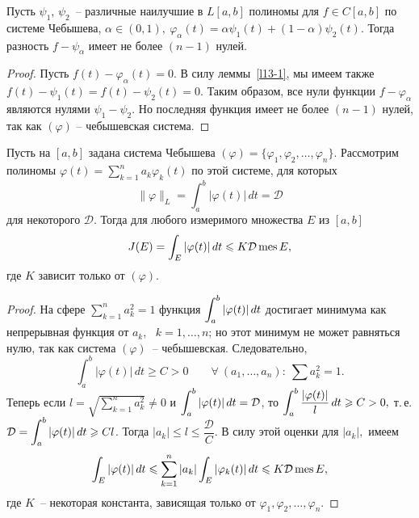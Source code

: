 \begin{lemma}\label{J-sign-change}
Пусть $\psi_1$, $\psi_2$~-- различные наилучшие {в $L[a,b]$} полиномы для
{$f \in C[a,b]$} по системе Чебышева, $\alpha\in (0,1),\ \varphi_{\alpha}(t)=
\alpha\psi_1(t)+(1-\alpha)\psi_2(t)$. Тогда разность
$f-\psi_{\alpha}$ имеет не более $(n-1)$ нулей.
\end{lemma}

\begin{proof}
Пусть $f(t)-\varphi_{\alpha}(t)=0.$ В силу
леммы~\ref{l13-1}, мы имеем также $f(t)-\psi_1(t)=f(t)-\psi_2(t)=0.$
Таким образом, все нули функции $f-\varphi_{\alpha}$
являются нулями $\psi_1-\psi_2.$ Но последняя функция имеет
не более $(n-1)$ нулей, так как $(\varphi)$ -- чебышевская
система.
\end{proof}

\begin{lemma}\label{J-integral}
Пусть на $[a,b]$ задана система Чебышева $(\varphi) = \{\varphi_1, \varphi_2, \ldots, \varphi_n\}$. Рассмотрим полиномы
$\varphi(t)=\sum\limits_{k=1}^n a_k \varphi_k(t)$ по этой системе, для которых
$$
\|\varphi\|_L=\int_a^b |\varphi(t)|\, dt=\mathcal D
$$
для некоторого $\mathcal D$. Тогда для любого измеримого множества $E$ из $[a,b]$
$$
J(E)=\int_E |\varphi(t)|\, dt \leqslant K\mathcal D\,{\rm mes \, } E,
$$
где $K$ зависит только от $(\varphi)$.
\end{lemma}

\begin{proof}
На сфере $\sum\limits_{k=1}^n a_k^2=1$ функция $\displaystyle\int_a^b |\varphi(t)|\, dt$ достигает минимума как непрерывная функция от $a_k$,~
$k=1,\ldots,n$; но этот минимум не может равняться нулю, так как система $(\varphi)$~-- чебышевская. Следовательно,
$$
\int_a^b |\varphi(t)|\, dt \ge C>0\qquad \forall \ (a_1,\ldots,a_n)\colon \ \sum a_k^2=1.
$$
Теперь если $l=\sqrt{\sum\limits_{k=1}^n a_k^2}\ne 0$ и
$\displaystyle\int_a^b |\varphi(t)|\,dt=\mathcal D$, то
$\displaystyle\int_a^b \frac{|\varphi(t)|}{l}\,dt\geqslant C>0,$
т.\,е. $\mathcal D = \displaystyle\int_a^b |\varphi(t)|\, dt\geqslant Cl$.
Тогда $|a_k|\le l\le \dfrac{\mathcal D}{C}.$
В силу этой оценки для $|a_k|,$ имеем
$$
\int_E |\varphi(t)|\, dt\leqslant \sum\limits_{k=1}^n |a_k| \int_E
|\varphi_k(t)|\,dt\leqslant K\mathcal D \,{\rm mes \, } E,
$$
где $K$~-- некоторая константа, зависящая только от $\varphi_1,\varphi_2,\ldots,\varphi_n.$
\end{proof}

